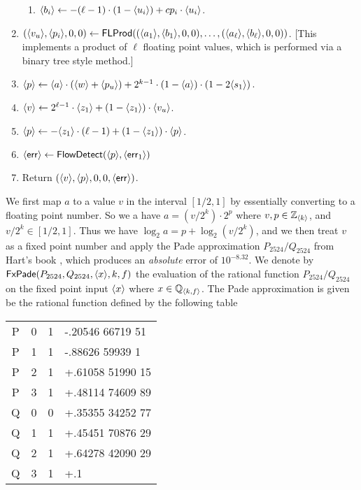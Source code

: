 \begin{enumerate}
\begin{enumerate}
  \item $\langle b_i \rangle \leftarrow -(\ell-1) \cdot (1-\langle u_i \rangle)+cp_i \cdot \langle u_i \rangle$.
\end{enumerate}
\item $(\langle v_u \rangle,\langle p_i \rangle,0,0)
	\leftarrow \mathsf{FLProd}((\langle a_1 \rangle,\langle b_1 \rangle,0,0), \ldots,
	                     (\langle a_\ell \rangle,\langle b_\ell \rangle,0,0))$. 
			     [This implements a product of $\ell$ floating point values, which is
			      performed via a binary tree style method.]
\item $\langle p \rangle \leftarrow \langle a \rangle \cdot (\langle w \rangle+\langle p_u \rangle)
			+2^{k-1}\cdot (1-\langle a \rangle) \cdot (1-2 \langle s_1 \rangle)$.
\item $\langle v \rangle \leftarrow 2^{\ell-1} \cdot \langle z_1 \rangle+(1-\langle z_1 \rangle) \cdot \langle v_u \rangle$.
\item $\langle p \rangle \leftarrow -\langle z_1 \rangle \cdot (\ell-1)
			+(1-\langle z_1 \rangle) \cdot \langle p \rangle$.
\item $\langle \mathsf{err} \rangle \leftarrow \mathsf{FlowDetect}(\langle p \rangle,\langle \mathsf{err}_1 \rangle)$
\item Return $(\langle v \rangle,\langle p \rangle,0,0,\langle \mathsf{err} \rangle)$.
\end{enumerate}

We first map $a$ to a value $v$ in the interval $[1/2,1]$ by essentially
converting to a floating point number.
So we a have $a=(v/2^k) \cdot 2^p$ where $v, p \in {\mathbb{Z}}_{\langle k \rangle}$,
and $v/2^k \in [1/2,1]$.
Thus we have 
$\log_2 a = p+\log_2 (v/2^k)$, and we then treat $v$ as a fixed
point number and apply the Pade approximation $P_{2524}/Q_{2524}$
from Hart's book \cite{Hart:1978:CA:540084},
which produces an {\em absolute} error of $10^{-8.32}$.
We denote by $\mathsf{FxPade}(P_{2524},Q_{2524},\langle x \rangle,k,f)$ the evaluation
of the rational function $P_{2524}/Q_{2524}$ on the fixed point input $\langle x \rangle$
where $x \in {\mathbb{Q}}_{\langle k, f \rangle}$.
The Pade approximation is given be the rational function defined
by the following table
\begin{center}
\begin{tabular}{|c|c|c|l|}
\hline
P & 0 & 1  & -.20546 66719 51 \\
P & 1 & 1  & -.88626 59939 1 \\
P & 2 & 1  & +.61058 51990 15 \\
P & 3 & 1  & +.48114 74609 89 \\ 
Q & 0 & 0  & +.35355 34252 77 \\ 
Q & 1 & 1  & +.45451 70876 29  \\
Q & 2 & 1  & +.64278 42090 29 \\ 
Q & 3 & 1  & +.1 \\ 
\hline
\end{tabular}
\end{center}

